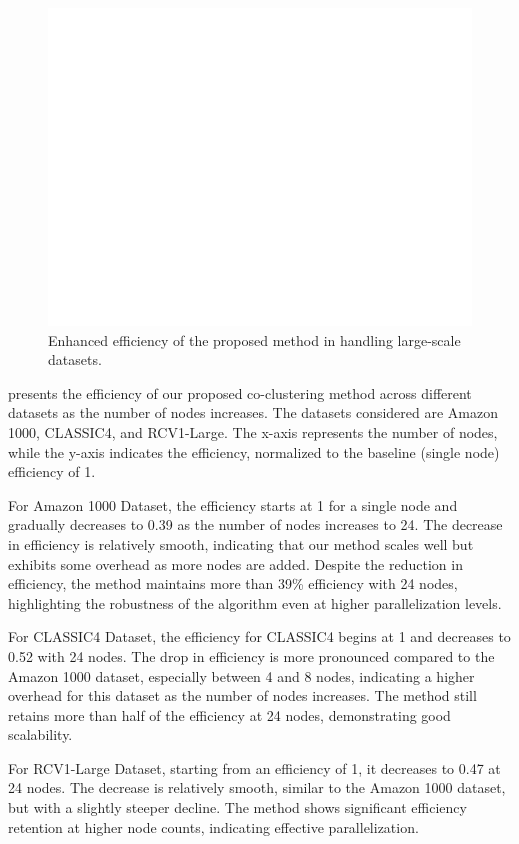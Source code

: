 \documentclass[journal]{IEEEtran}
\theoremstyle{definition}
\theoremstyle{remark} %
\begin{document}
\begin{figure}[htbp]
    \centering
    \includegraphics[width=0.8\linewidth]{efficiency.png}
    \caption{Enhanced efficiency of the proposed method in handling large-scale datasets.}
    \label{fig:efficiency}
\end{figure}

 presents the efficiency of our proposed co-clustering method across different datasets as the number of nodes increases. The datasets considered are Amazon 1000, CLASSIC4, and RCV1-Large. The x-axis represents the number of nodes, while the y-axis indicates the efficiency, normalized to the baseline (single node) efficiency of 1.

For Amazon 1000 Dataset, the efficiency starts at 1 for a single node and gradually decreases to 0.39 as the number of nodes increases to 24. The decrease in efficiency is relatively smooth, indicating that our method scales well but exhibits some overhead as more nodes are added. Despite the reduction in efficiency, the method maintains more than 39\% efficiency with 24 nodes, highlighting the robustness of the algorithm even at higher parallelization levels.

For CLASSIC4 Dataset, the efficiency for CLASSIC4 begins at 1 and decreases to 0.52 with 24 nodes. The drop in efficiency is more pronounced compared to the Amazon 1000 dataset, especially between 4 and 8 nodes, indicating a higher overhead for this dataset as the number of nodes increases. The method still retains more than half of the efficiency at 24 nodes, demonstrating good scalability.

For RCV1-Large Dataset, starting from an efficiency of 1, it decreases to 0.47 at 24 nodes. The decrease is relatively smooth, similar to the Amazon 1000 dataset, but with a slightly steeper decline. The method shows significant efficiency retention at higher node counts, indicating effective parallelization.
\end{document}
